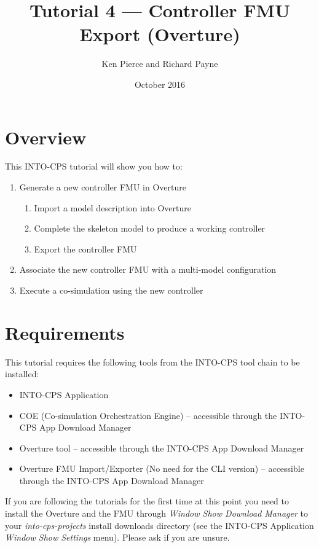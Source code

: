 \documentclass[11pt,a4paper]{../tutorial}
\title{Tutorial 4 --- Controller FMU Export (Overture)}
\date{October 2016}
\author{Ken Pierce and Richard Payne}
\begin{document}
\section*{Overview}

This INTO-CPS tutorial will show you how to:

\begin{enumerate}[noitemsep]
\item Generate a new controller FMU in Overture
    \begin{enumerate}[noitemsep]
        \item Import a model description into Overture
        \item Complete the skeleton model to produce a working controller
        \item Export the controller FMU
    \end{enumerate}
\item Associate the new controller FMU with a multi-model configuration
\item Execute a co-simulation using the new controller
\end{enumerate}


\section*{Requirements}

This tutorial requires the following tools from the INTO-CPS tool chain to be installed:

\begin{itemize}[noitemsep]
\item INTO-CPS Application
\item COE (Co-simulation Orchestration Engine) -- accessible through the INTO-CPS App Download Manager
\item Overture tool -- accessible through the INTO-CPS App Download Manager
\item Overture FMU Import/Exporter (No need for the CLI version)  -- accessible through the INTO-CPS App Download Manager
\end{itemize}

If you are following the tutorials for the first time at this point you need to install the Overture and the FMU through \emph{Window \menusep Show Download Manager} to your \emph{into-cps-projects} install downloads directory (see the INTO-CPS Application \emph{Window \menusep Show Settings} menu). Please ask if you are unsure.
\end{document}
